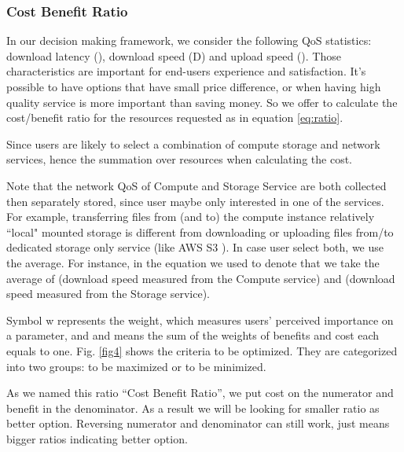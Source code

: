 \documentclass[journal]{IEEEtran}
\begin{document}
\subsubsection{Cost Benefit Ratio}
\label{subsec:cost_benefit_ratio}

In our decision making framework, we consider the following QoS statistics: download latency (), download speed (D) and upload speed (). Those characteristics are important for end-users experience and satisfaction. It's possible to have options that have small price difference, or when having high quality service is more important than saving money. So we offer to calculate the cost/benefit ratio for the resources requested as in equation \ref{eq:ratio}.


Since users are likely to select a combination of compute storage and network services, hence the summation over resources when calculating the cost.

Note that the network QoS of Compute and Storage Service are both collected then separately stored, since user maybe only interested in one of the services. For example, transferring files from (and to) the compute instance relatively ``local"  mounted storage is different from downloading or uploading files from/to dedicated storage only service (like AWS S3 \cite{S3}). In case user select both, we use the average. For instance, in the equation we used  to denote that we take the average of (download speed measured from the Compute service) and   (download speed measured from the Storage service).

Symbol w represents the weight, which measures users' perceived importance on a parameter, and  and  means the sum of the weights of benefits and cost each equals to one. Fig. \ref{fig4} shows the criteria to be optimized. They are categorized into two groups: to be maximized or to be minimized.

As we named this ratio ``Cost Benefit Ratio'', we put cost on the numerator and benefit in the denominator. As a result we will be looking for smaller ratio as better option. Reversing numerator and denominator can still work, just means bigger ratios indicating better option.
\end{document}

